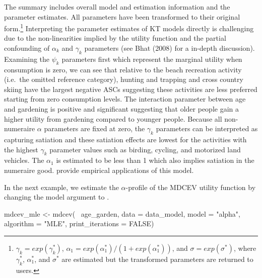 The summary includes overall model and estimation information and the
parameter estimates. All parameters have been transformed to their
original form.\footnote{\(\gamma_k = exp(\gamma^*_k)\),
  \(\alpha_1 = exp(\alpha^*_1)/(1 + exp(\alpha^*_1))\), and
  \(\sigma = exp(\sigma^*)\), where \(\gamma^*_k\), \(\alpha^*_1\), and
  \(\sigma^*\) are estimated but the transformed parameters are returned
  to users.} Interpreting the parameter estimates of KT models directly
is challenging due to the non-linearities implied by the utility
function and the partial confounding of \(\alpha_k\) and \(\gamma_k\)
parameters (see Bhat (2008) for a in-depth discussion). Examining the
\(\psi_k\) parameters first which represent the marginal utility when
consumption is zero, we can see that relative to the beach recreation
activity (i.e.~the omitted reference category), hunting and trapping and
cross country skiing have the largest negative ASCs suggesting these
activities are less preferred starting from zero consumption levels. The
interaction parameter between age and gardening is positive and
significant suggesting that older people gain a higher utility from
gardening compared to younger people. Because all non-numeraire
\(\alpha\) parameters are fixed at zero, the \(\gamma_k\) parameters can
be interpreted as capturing satiation and these satiation effects are
lowest for the activities with the highest \(\gamma_k\) parameter values
such as birding, cycling, and motorized land vehicles. The \(\alpha_1\)
is estimated to be less than 1 which also implies satiation in the
numeraire good. \citet{bhatmultiple2008, lloyd-smithdecoupling2019}
provide empirical applications of this model.

In the next example, we estimate the \(\alpha\)-profile of the MDCEV
utility function by changing the model argument to .

\begin{example}
mdcev_mle <- mdcev(~ age_garden,
                   data = data_model,
                   model = "alpha",
                   algorithm = "MLE",
                   print_iterations = FALSE)

\end{example}

